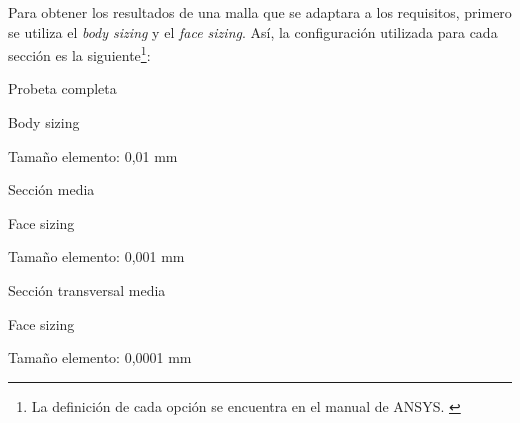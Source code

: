Para obtener los resultados de una malla que se adaptara a los requisitos, primero se utiliza el \textit{body sizing} y el \textit{face sizing}. Así, la configuración utilizada para cada sección es la siguiente\footnote{La definición de cada opción se encuentra en el manual de ANSYS. \cite{sharcnet_mesh}}:
\begin{itemize*}
	\item Probeta completa
		\begin{itemize*}
			\item Body sizing
			\item Tamaño elemento: 0,01 mm
		\end{itemize*}
	\item Sección media
		\begin{itemize*}
			\item Face sizing
			\item Tamaño elemento: 0,001 mm
		\end{itemize*}
	\item Sección transversal media
		\begin{itemize*}
			\item Face sizing
			\item Tamaño elemento: 0,0001 mm
		\end{itemize*}
\end{itemize*}

